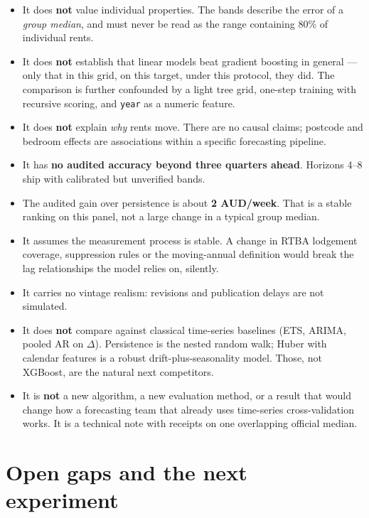 \documentclass[11pt,a4paper]{article}
\begin{document}
\begin{itemize}
\item It does \textbf{not} value individual properties. The bands describe the error of a \emph{group median}, and must never be read as the range containing 80\% of individual rents.
\item It does \textbf{not} establish that linear models beat gradient boosting in general --- only that in this grid, on this target, under this protocol, they did. The comparison is further confounded by a light tree grid, one-step training with recursive scoring, and \texttt{year} as a numeric feature.
\item It does \textbf{not} explain \emph{why} rents move. There are no causal claims; postcode and bedroom effects are associations within a specific forecasting pipeline.
\item It has \textbf{no audited accuracy beyond three quarters ahead}. Horizons 4--8 ship with calibrated but unverified bands.
\item The audited gain over persistence is about \textbf{2 AUD/week}. That is a stable ranking on this panel, not a large change in a typical group median.
\item It assumes the measurement process is stable. A change in RTBA lodgement coverage, suppression rules or the moving-annual definition would break the lag relationships the model relies on, silently.
\item It carries no vintage realism: revisions and publication delays are not simulated.
\item It does \textbf{not} compare against classical time-series baselines (ETS, ARIMA, pooled AR on \(\Delta\)). Persistence is the nested random walk; Huber with calendar features is a robust drift-plus-seasonality model. Those, not XGBoost, are the natural next competitors.
\item It is \textbf{not} a new algorithm, a new evaluation method, or a result that would change how a forecasting team that already uses time-series cross-validation works. It is a technical note with receipts on one overlapping official median.
\end{itemize}

\section{Open gaps and the next experiment}
\end{document}
